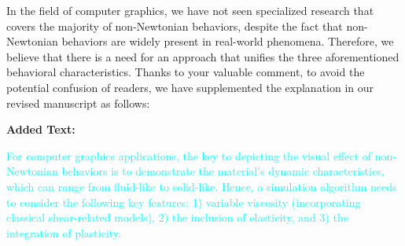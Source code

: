\documentclass[12pt,a4paper]{article}
\newcommand{\revised}[1]{\textcolor{cyan}{#1}}
\begin{document}
In the field of computer graphics, we have not seen specialized research that covers the majority of non-Newtonian behaviors, despite the fact that non-Newtonian behaviors are widely present in real-world phenomena. Therefore, we believe that there is a need for an approach that unifies the three aforementioned behavioral characteristics.
Thanks to your valuable comment, to avoid the potential confusion of readers, we have supplemented the explanation in our revised manuscript as follows:

\vspace{0.4cm}
\textbf{Added Text:}

\revised{For computer graphics applications, the key to depicting the visual effect of non-Newtonian behaviors is to demonstrate the material’s dynamic characteristics, which can range from fluid-like to solid-like. Hence, a simulation algorithm needs to consider the following key features: 1) variable viscosity (incorporating classical shear-related models), 2) the inclusion of elasticity, and 3) the integration of plasticity.}
\end{document}
